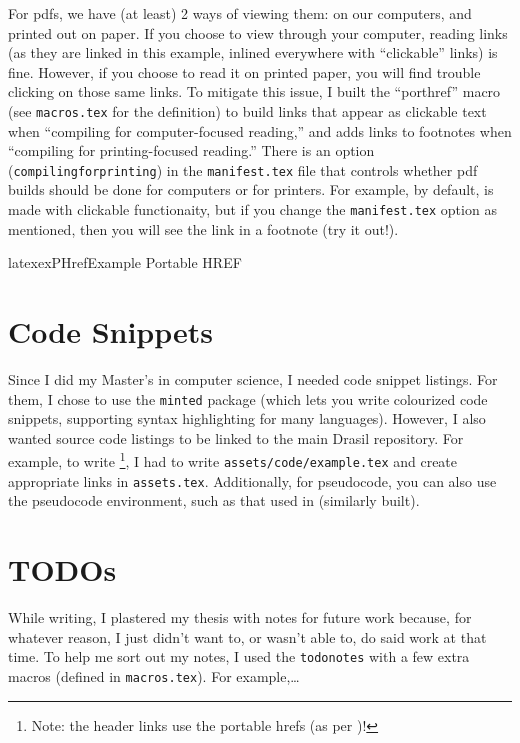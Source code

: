 For \acsp{pdf}, we have (at least) 2 ways of viewing them: on our computers, and
printed out on paper. If you choose to view through your computer, reading links
(as they are linked in this example, inlined everywhere with ``clickable''
links) is fine. However, if you choose to read it on printed paper, you will
find trouble clicking on those same links. To mitigate this issue, I built the
``porthref'' macro (see \texttt{macros.tex} for the definition) to build links
that appear as clickable text when ``compiling for computer-focused reading,''
and adds links to footnotes when ``compiling for printing-focused reading.''
There is an option (\texttt{compilingforprinting}) in the \texttt{manifest.tex}
file that controls whether \acs{pdf} builds should be done for computers or for
printers. For example, by default, 
is made with clickable functionaity, but if you change the \texttt{manifest.tex}
option as mentioned, then you will see the link in a footnote (try it out!).


\begin{pseudocode}{latex}{exPHref}{Example Portable HREF}
\end{pseudocode}

\section{Code Snippets}
\label{chap:extras:sec:code-snippets}

Since I did my Master's in computer science, I needed code snippet listings. For
them, I chose to use the \texttt{minted} package (which lets you write
colourized code snippets, supporting syntax highlighting for many languages).
However, I also wanted source code listings to be linked to the main Drasil
\cite{Drasil2021} repository. For example, to write
\footnote{Note: the header links use the portable \acsp{href}
(as per )!}, I had to write
\texttt{assets/code/example.tex} and create appropriate links in
\texttt{assets.tex}. Additionally, for pseudocode, you can also use the
pseudocode environment, such as that used in  (similarly
built).

\section{TODOs}
\label{chap:extras:sec:todos}

While writing, I plastered my thesis with notes for future work because, for
whatever reason, I just didn't want to, or wasn't able to, do said work at that
time. To help me sort out my notes, I used the \texttt{todonotes}
 with a few extra
macros (defined in \texttt{macros.tex}). For example,\ldots{}

